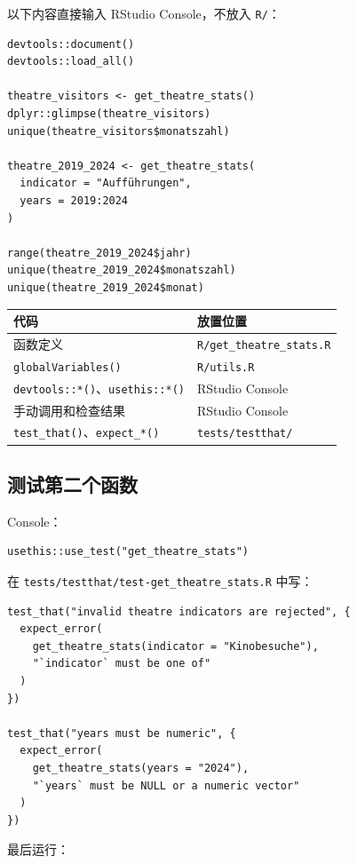 \documentclass[11pt,a4paper]{ctexart}
\begin{document}
以下内容直接输入 RStudio Console，不放入 \texttt{R/}：

\begin{lstlisting}
devtools::document()
devtools::load_all()

theatre_visitors <- get_theatre_stats()
dplyr::glimpse(theatre_visitors)
unique(theatre_visitors$monatszahl)

theatre_2019_2024 <- get_theatre_stats(
  indicator = "Aufführungen",
  years = 2019:2024
)

range(theatre_2019_2024$jahr)
unique(theatre_2019_2024$monatszahl)
unique(theatre_2019_2024$monat)
\end{lstlisting}

\begin{longtable}{p{}p{}}
\toprule
代码 & 放置位置 \\
\midrule
函数定义 & \texttt{R/get\_theatre\_stats.R} \\
\texttt{globalVariables()} & \texttt{R/utils.R} \\
\texttt{devtools::*()}、\texttt{usethis::*()} & RStudio Console \\
手动调用和检查结果 & RStudio Console \\
\texttt{test\_that()}、\texttt{expect\_*()} & \texttt{tests/testthat/} \\
\bottomrule
\end{longtable}

\subsection{测试第二个函数}

Console：

\begin{lstlisting}
usethis::use_test("get_theatre_stats")
\end{lstlisting}

在 \texttt{tests/testthat/test-get\_theatre\_stats.R} 中写：

\begin{lstlisting}
test_that("invalid theatre indicators are rejected", {
  expect_error(
    get_theatre_stats(indicator = "Kinobesuche"),
    "`indicator` must be one of"
  )
})

test_that("years must be numeric", {
  expect_error(
    get_theatre_stats(years = "2024"),
    "`years` must be NULL or a numeric vector"
  )
})
\end{lstlisting}

最后运行：
\end{document}
